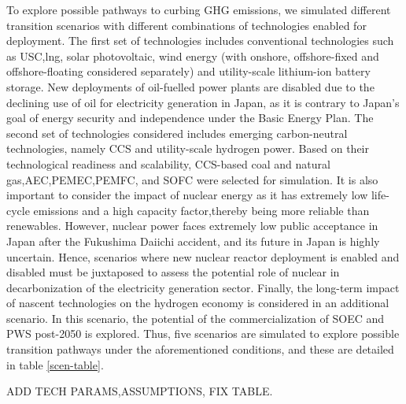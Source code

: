 To explore possible pathways to curbing \gls{GHG} emissions, we simulated different transition scenarios with different combinations of technologies enabled for deployment. The first set of technologies includes conventional technologies such as  \gls{USC},\gls{lng}, solar photovoltaic, wind energy (with onshore, offshore-fixed and offshore-floating considered separately) and utility-scale lithium-ion battery storage. New deployments of oil-fuelled power plants are disabled due to the declining use of oil for electricity generation in Japan, as it is contrary to Japan's goal of energy security and independence under the Basic Energy Plan. The second set of technologies considered includes emerging carbon-neutral technologies, namely \gls{CCS} and utility-scale hydrogen power. Based on their technological readiness and scalability, \gls{CCS}-based coal and natural gas,\gls{AEC},\gls{PEMEC},\gls{PEMFC}, and \gls{SOFC} were selected for simulation. It is also important to consider the impact of nuclear energy as it has extremely low life-cycle emissions and a high capacity factor,thereby being more reliable than renewables. However, nuclear power faces extremely low public acceptance in Japan after the Fukushima Daiichi accident, and its future in Japan is highly uncertain. Hence, scenarios where new nuclear reactor deployment is enabled and disabled must be juxtaposed to assess the potential role of nuclear in decarbonization of the electricity generation sector. Finally, the long-term impact of nascent technologies on the hydrogen economy is considered in an additional scenario. In this scenario, the potential of the commercialization of \gls{SOEC} and \gls{PWS} post-2050 is explored. Thus, five scenarios are simulated to explore possible transition pathways under the aforementioned conditions, and these are detailed in table \ref{scen-table}.

ADD TECH PARAMS,ASSUMPTIONS, FIX TABLE.



